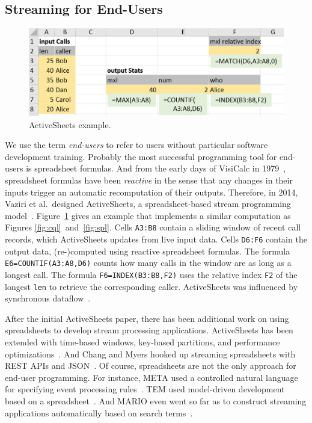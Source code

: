 \subsection{Streaming for End-Users}\label{sec:eup} %

\begin{figure}[!h]
\centerline{\includegraphics[width=\columnwidth]{CallStats.jpg}}
\vspace*{-4mm}
\caption{\label{fig:activesheets}ActiveSheets example.}
\end{figure}

We use the term \emph{end-users} to refer to users without particular
software development training. Probably the most successful
programming tool for end-users is spreadsheet formulas. And from the
early days of VisiCalc in 1979~\cite{bricklin_frankston_1979},
spreadsheet formulas have been \emph{reactive} in the sense that any
changes in their inputs trigger an automatic recomputation of their
outputs. Therefore, in 2014, Vaziri et al.\ designed ActiveSheets, a
spreadsheet-based stream programming model~\cite{vaziri_et_al_2014}.
Figure~\ref{fig:activesheets} gives an example that implements a
similar computation as Figures \mbox{\ref{fig:cql} and \ref{fig:spl}}.
Cells \lstinline{A3:B8} contain a sliding window of recent call
records, which ActiveSheets updates from live input data. Cells
\lstinline{D6:F6} contain the output data, \mbox{(re-)}com\-pu\-ted
using reactive spreadsheet formulas. The formula
\mbox{\lstinline{E6=COUNTIF(A3:A8,D6)}} counts how many calls in the
window are as long as a longest call. The formula
\mbox{\lstinline{F6=INDEX(B3:B8,F2)}} uses the relative index \lstinline{F2}
of the longest \lstinline{len} to retrieve the corresponding
caller.  ActiveSheets was influenced by
synchronous data\-flow~\cite{lustre_1987}.

After the initial ActiveSheets paper, there has been additional work
on using spreadsheets to develop stream processing applications.
ActiveSheets has been extended with time-based windows, key-based
partitions, and performance optimizations~\cite{hirzel_et_al_2016}.
And Chang and Myers hooked up streaming spreadsheets with REST APIs and
JSON~\cite{chang_myers_2015}.  Of course, spreadsheets are not the
only approach for end-user programming. For instance, META used a
controlled natural language for specifying event processing
rules~\cite{arnold_et_al_2016}. TEM used model-driven development
based on a spreadsheet~\cite{etzion_et_al_2016}. And MARIO even went
so far as to construct streaming applications automatically based on
search terms~\cite{riabov_et_al_2008}.
